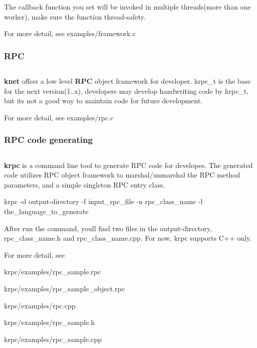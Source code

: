 The callback function you set will be invoked in multiple threads(more than one worker), make sure the function thread-\/safety.

For more detail, see {\ttfamily examples/framework.\+c}

\subsubsection*{R\+P\+C}

\subsection*{}

{\bfseries knet} offers a low level {\bfseries R\+P\+C} object framework for developer. {\ttfamily krpc\+\_\+t} is the base for the next version(1..\+x), developers may develop handwriting code by {\ttfamily krpc\+\_\+t}, but its not a good way to maintain code for future development.

For more detail, see {\ttfamily examples/rpc.\+c}

\subsubsection*{R\+P\+C code generating}

\subsection*{}

{\bfseries krpc} is a command line tool to generate R\+P\+C code for developes. The generated code utilizes R\+P\+C object framework to marshal/unmarshal the R\+P\+C method parameters, and a simple singleton R\+P\+C entry class.

{\ttfamily krpc -\/d output-\/directory -\/f input\+\_\+rpc\+\_\+file -\/n rpc\+\_\+class\+\_\+name -\/l the\+\_\+language\+\_\+to\+\_\+generate}

After run the command, you\textquotesingle{}ll find two files in the output-\/directory, {\ttfamily rpc\+\_\+class\+\_\+name.\+h} and {\ttfamily rpc\+\_\+class\+\_\+name.\+cpp}. For now, {\ttfamily krpc} supports C++ only.

For more detail, see


\begin{DoxyItemize}
\item {\ttfamily krpc/examples/rpc\+\_\+sample.\+rpc}
\item {\ttfamily krpc/examples/rpc\+\_\+sample\+\_\+object.\+rpc}
\item {\ttfamily krpc/examples/rpc.\+cpp}
\item {\ttfamily krpc/examples/rpc\+\_\+sample.\+h}
\item {\ttfamily krpc/examples/rpc\+\_\+sample.\+cpp}
\end{DoxyItemize}

